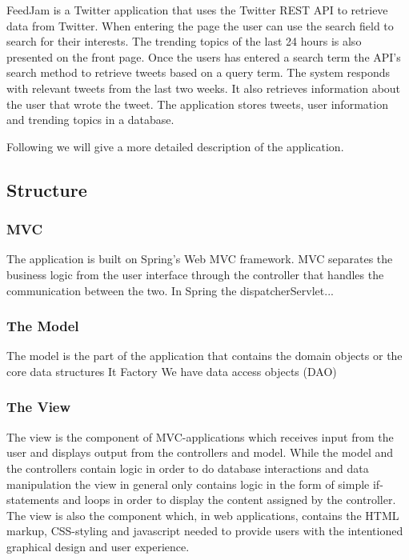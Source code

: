 FeedJam is a Twitter application that uses the Twitter REST API to retrieve data from Twitter. When entering the page the user can use the search field to search for their interests. The trending topics of the last 24 hours is also presented on the front page. Once the users has entered a search term the API's search method to retrieve tweets based on a query term. 
The system responds with relevant tweets from the last two weeks. It also retrieves information about the user that wrote the tweet. The application stores tweets, user information and trending topics in a database. 

Following we will give a more detailed description of the application.

\subsection{Structure}

\subsubsection{MVC} %
The application is built on Spring's Web MVC framework. MVC separates the business logic from the user interface through the controller that handles the communication between the two. In Spring the dispatcherServlet...%


\subsubsection{The Model} %
The model is the part of the application that contains the domain objects or the core data structures \citep{}%
It 
Factory
We have data access objects (DAO) 
\subsubsection{The View}
The view is the component of MVC-applications which receives input from the user and displays output from the controllers and model. While the model and the controllers contain logic in order to do database interactions and data manipulation the view in general only contains logic in the form of simple if-statements and loops in order to display the content assigned by the controller. The view is also the component which, in web applications, contains the HTML markup, CSS-styling and javascript needed to provide users with the intentioned graphical design and user experience.

